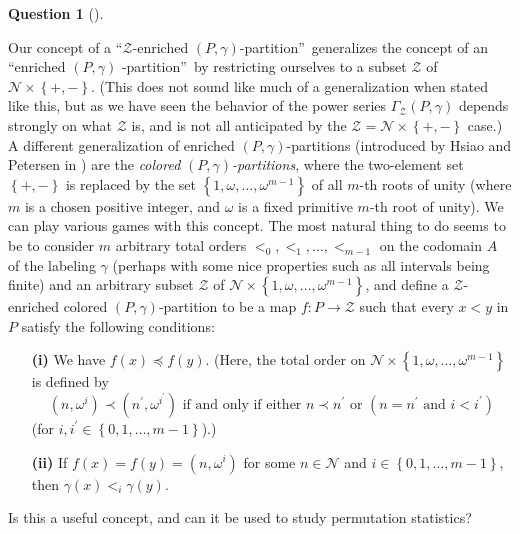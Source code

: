 \documentclass[numbers=enddot,12pt,final,onecolumn,notitlepage]{scrartcl}%
\theoremstyle{definition}
\newtheorem{quest}[theo]{Question}
\newenvironment{question}[1][]
{\begin{quest}[#1]\begin{leftbar}}
{\end{leftbar}\end{quest}}
\newenvironment{question}[1][Question]{\noindent\textbf{#1.} }{\ \rule{0.5em}{0.5em}}
\begin{document}
\begin{question}
Our concept of a \textquotedblleft$\mathcal{Z}$-enriched $\left(
P,\gamma\right)  $-partition\textquotedblright\ generalizes the concept of an
\textquotedblleft enriched $\left(  P,\gamma\right)  $%
-partition\textquotedblright\ by restricting ourselves to a subset
$\mathcal{Z}$ of $\mathcal{N}\times\left\{  +,-\right\}  $. (This does not
sound like much of a generalization when stated like this, but as we have seen
the behavior of the power series $\Gamma_{\mathcal{Z}}\left(  P,\gamma\right)
$ depends strongly on what $\mathcal{Z}$ is, and is not all anticipated by the
$\mathcal{Z}=\mathcal{N}\times\left\{  +,-\right\}  $ case.) A different
generalization of enriched $\left(  P,\gamma\right)  $-partitions (introduced
by Hsiao and Petersen in \cite{HsiPet10}) are the \textit{colored }$\left(
P,\gamma\right)  $\textit{-partitions}, where the two-element set $\left\{
+,-\right\}  $ is replaced by the set $\left\{  1,\omega,\ldots,\omega
^{m-1}\right\}  $ of all $m$-th roots of unity (where $m$ is a chosen positive
integer, and $\omega$ is a fixed primitive $m$-th root of unity). We can play
various games with this concept. The most natural thing to do seems to be to
consider $m$ arbitrary total orders $<_{0},<_{1},\ldots,<_{m-1}$ on the
codomain $A$ of the labeling $\gamma$ (perhaps with some nice properties such
as all intervals being finite) and an arbitrary subset $\mathcal{Z}$ of
$\mathcal{N}\times\left\{  1,\omega,\ldots,\omega^{m-1}\right\}  $, and define
a $\mathcal{Z}$-enriched colored $\left(  P,\gamma\right)  $-partition to be a
map $f:P\rightarrow\mathcal{Z}$ such that every $x<y$ in $P$ satisfy the
following conditions:

\begin{enumerate}
\item[\textbf{(i)}] We have $f\left(  x\right)  \preccurlyeq f\left(
y\right)  $. (Here, the total order on $\mathcal{N}\times\left\{
1,\omega,\ldots,\omega^{m-1}\right\}  $ is defined by%
\[
\left(  n,\omega^{i}\right)  \prec\left(  n^{\prime},\omega^{i^{\prime}%
}\right)  \text{ if and only if either }n\prec n^{\prime}\text{ or }\left(
n=n^{\prime}\text{ and }i<i^{\prime}\right)
\]
(for $i,i^{\prime}\in\left\{  0,1,\ldots,m-1\right\}  $).)

\item[\textbf{(ii)}] If $f\left(  x\right)  =f\left(  y\right)  =\left(
n,\omega^{i}\right)  $ for some $n\in\mathcal{N}$ and $i\in\left\{
0,1,\ldots,m-1\right\}  $, then $\gamma\left(  x\right)  <_{i}\gamma\left(
y\right)  $.
\end{enumerate}

Is this a useful concept, and can it be used to study permutation statistics?
\end{question}
\end{document}
